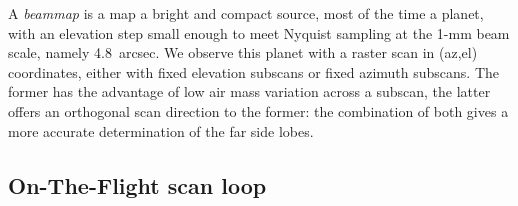 A {\it beammap} is a map a bright and compact source, most of the time
a planet, with an elevation step small enough to meet Nyquist sampling at the 1-mm
beam scale, namely 4.8~arcsec. We observe this planet with a raster scan in
(az,el) coordinates, either with fixed elevation subscans or fixed azimuth
subscans. The former has the advantage of low air mass variation across a
subscan, the latter offers an orthogonal scan direction to the former: the
combination of both gives a more accurate determination of the far side
lobes. 


\subsection{On-The-Flight scan loop}




